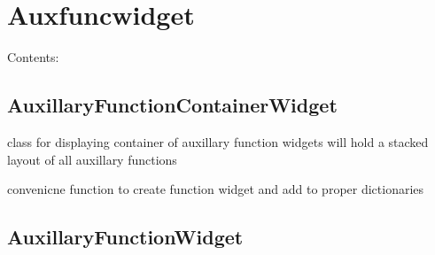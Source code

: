 \documentclass[letterpaper,10pt,english]{sphinxmanual}
\begin{document}
\chapter{Auxfuncwidget}
\label{Auxfuncwidget:auxfuncwidget}\label{Auxfuncwidget::doc}
Contents:


\section{AuxillaryFunctionContainerWidget}
\label{AuxillaryFunctionContainerWidget::doc}\label{AuxillaryFunctionContainerWidget:auxillaryfunctioncontainerwidget}

\begin{fulllineitems}
\label{AuxillaryFunctionContainerWidget:Auxfuncwidget.AuxillaryFunctionContainerWidget}
class for displaying container of auxillary function widgets
will hold a stacked layout of all auxillary functions

\begin{fulllineitems}
\label{AuxillaryFunctionContainerWidget:Auxfuncwidget.AuxillaryFunctionContainerWidget.add_element}
convenicne function to create function widget and add to proper
dictionaries

\end{fulllineitems}


\begin{fulllineitems}
\label{AuxillaryFunctionContainerWidget:Auxfuncwidget.AuxillaryFunctionContainerWidget.re_import}
\end{fulllineitems}


\end{fulllineitems}



\section{AuxillaryFunctionWidget}
\label{AuxillaryFunctionWidget:auxillaryfunctionwidget}\label{AuxillaryFunctionWidget::doc}
\end{document}
